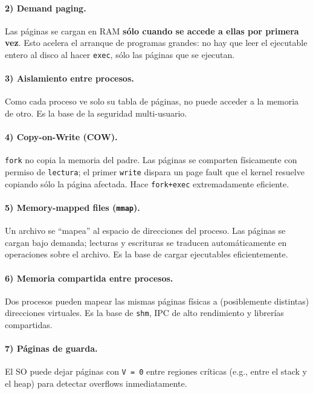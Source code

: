 \documentclass[11pt,a4paper]{article}
\begin{document}
\paragraph{2) Demand paging.}
Las páginas se cargan en RAM \textbf{sólo cuando se accede a ellas
por primera vez}. Esto acelera el arranque de programas grandes:
no hay que leer el ejecutable entero al disco al hacer \texttt{exec},
sólo las páginas que se ejecutan.

\paragraph{3) Aislamiento entre procesos.}
Como cada proceso ve solo su tabla de páginas, no puede acceder a la
memoria de otro. Es la base de la seguridad multi-usuario.

\paragraph{4) Copy-on-Write (COW).}
\texttt{fork} no copia la memoria del padre. Las páginas se
comparten físicamente con permiso de \texttt{lectura}; el primer
\texttt{write} dispara un page fault que el kernel resuelve copiando
sólo la página afectada. Hace \texttt{fork+exec} extremadamente
eficiente.

\paragraph{5) Memory-mapped files (\texttt{mmap}).}
Un archivo se ``mapea'' al espacio de direcciones del proceso. Las
páginas se cargan bajo demanda; lecturas y escrituras se traducen
automáticamente en operaciones sobre el archivo. Es la base de
cargar ejecutables eficientemente.

\paragraph{6) Memoria compartida entre procesos.}
Dos procesos pueden mapear las mismas páginas físicas a (posiblemente
distintas) direcciones virtuales. Es la base de \texttt{shm}, IPC
de alto rendimiento y librerías compartidas.

\paragraph{7) Páginas de guarda.}
El SO puede dejar páginas con \texttt{V = 0} entre regiones críticas
(e.g., entre el stack y el heap) para detectar overflows
inmediatamente.
\end{document}
